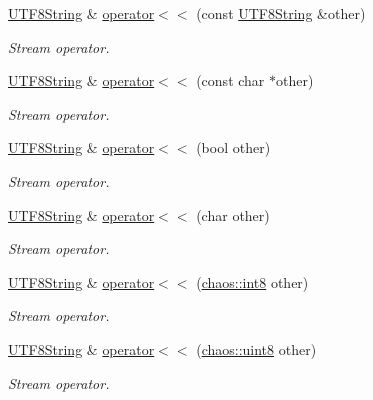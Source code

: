 \begin{DoxyCompactItemize}
\hyperlink{classchaos_1_1str_1_1_u_t_f8_string}{U\-T\-F8\-String} \& \hyperlink{classchaos_1_1str_1_1_u_t_f8_string_a3ab14e1ddffbadd664ebd4f228d11f17}{operator$<$$<$} (const \hyperlink{classchaos_1_1str_1_1_u_t_f8_string}{U\-T\-F8\-String} \&other)
\begin{DoxyCompactList}\small\item\em Stream operator. \end{DoxyCompactList}\item 
\hyperlink{classchaos_1_1str_1_1_u_t_f8_string}{U\-T\-F8\-String} \& \hyperlink{classchaos_1_1str_1_1_u_t_f8_string_ac3ca865b7f68b13b4b5902793bbb750d}{operator$<$$<$} (const char $\ast$other)
\begin{DoxyCompactList}\small\item\em Stream operator. \end{DoxyCompactList}\item 
\hyperlink{classchaos_1_1str_1_1_u_t_f8_string}{U\-T\-F8\-String} \& \hyperlink{classchaos_1_1str_1_1_u_t_f8_string_a9ef346ef5d7211de67578ce4bcc4a122}{operator$<$$<$} (bool other)
\begin{DoxyCompactList}\small\item\em Stream operator. \end{DoxyCompactList}\item 
\hyperlink{classchaos_1_1str_1_1_u_t_f8_string}{U\-T\-F8\-String} \& \hyperlink{classchaos_1_1str_1_1_u_t_f8_string_a1fe072a86408b3eb0b3fdfe9f80e3b8d}{operator$<$$<$} (char other)
\begin{DoxyCompactList}\small\item\em Stream operator. \end{DoxyCompactList}\item 
\hyperlink{classchaos_1_1str_1_1_u_t_f8_string}{U\-T\-F8\-String} \& \hyperlink{classchaos_1_1str_1_1_u_t_f8_string_a89937311871b473ed17bd83622e60530}{operator$<$$<$} (\hyperlink{namespacechaos_a56015674cfe4ad1fc583c3da6c724d8a}{chaos\-::int8} other)
\begin{DoxyCompactList}\small\item\em Stream operator. \end{DoxyCompactList}\item 
\hyperlink{classchaos_1_1str_1_1_u_t_f8_string}{U\-T\-F8\-String} \& \hyperlink{classchaos_1_1str_1_1_u_t_f8_string_abfce18f938382812ffeb3c399fdf679e}{operator$<$$<$} (\hyperlink{namespacechaos_a229e18634387996c2712d57f184bf363}{chaos\-::uint8} other)
\begin{DoxyCompactList}\small\item\em Stream operator. \end{DoxyCompactList}\item 

\end{DoxyCompactItemize}
